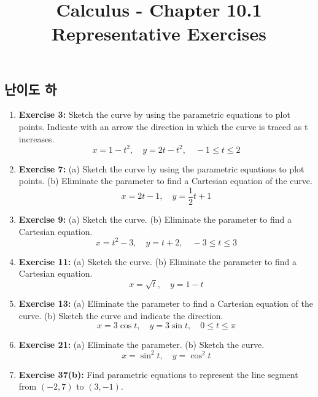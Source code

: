 \documentclass[12pt, a4paper]{article}
\title{Calculus - Chapter 10.1 Representative Exercises}
\author{}
\date{}
\begin{document}
\maketitle
\hrulefill
\vspace{1em}

\subsection*{난이도 하}
\begin{enumerate}
    \item \textbf{Exercise 3:} Sketch the curve by using the parametric equations to plot points. Indicate with an arrow the direction in which the curve is traced as t increases.
    \[ x = 1 - t^2, \quad y = 2t - t^2, \quad -1 \le t \le 2 \]

    \item \textbf{Exercise 7:} (a) Sketch the curve by using the parametric equations to plot points. (b) Eliminate the parameter to find a Cartesian equation of the curve.
    \[ x = 2t - 1, \quad y = \frac{1}{2}t + 1 \]

    \item \textbf{Exercise 9:} (a) Sketch the curve. (b) Eliminate the parameter to find a Cartesian equation.
    \[ x = t^2 - 3, \quad y = t + 2, \quad -3 \le t \le 3 \]

    \item \textbf{Exercise 11:} (a) Sketch the curve. (b) Eliminate the parameter to find a Cartesian equation.
    \[ x = \sqrt{t}, \quad y = 1 - t \]

    \item \textbf{Exercise 13:} (a) Eliminate the parameter to find a Cartesian equation of the curve. (b) Sketch the curve and indicate the direction.
    \[ x = 3\cos t, \quad y = 3\sin t, \quad 0 \le t \le \pi \]

    \item \textbf{Exercise 21:} (a) Eliminate the parameter. (b) Sketch the curve.
    \[ x = \sin^2 t, \quad y = \cos^2 t \]
    
    \item \textbf{Exercise 37(b):} Find parametric equations to represent the line segment from $(-2, 7)$ to $(3, -1)$.
\end{enumerate}

\hrulefill
\vspace{1em}
\end{document}
